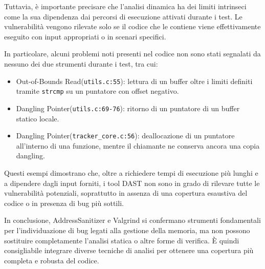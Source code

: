 Tuttavia, è importante precisare che l'analisi dinamica ha dei limiti intrinseci
come la sua dipendenza dai percorsi di esecuzione attivati durante i test. Le vulnerabilità
vengono rilevate solo se il codice che le contiene viene effettivamente eseguito
con input appropriati o in scenari specifici.

In particolare, alcuni problemi noti presenti nel codice non sono stati
segnalati da nessuno dei due strumenti durante i test, tra cui:
\begin{itemize}
  \item Out-of-Bounds Read(\texttt{utils.c:55}): lettura di un buffer oltre i
    limiti definiti tramite \texttt{strcmp} su un puntatore con offset negativo.

  \item Dangling Pointer(\texttt{utils.c:69-76}): ritorno di un puntatore di un
    buffer statico locale.

  \item Dangling Pointer(\texttt{tracker\_core.c:56}): deallocazione di un
    puntatore all'interno di una funzione, mentre il chiamante ne conserva ancora
    una copia dangling.
\end{itemize}

Questi esempi dimostrano che, oltre a richiedere tempi di esecuzione più lunghi
e a dipendere dagli input forniti, i tool DAST non sono in grado di rilevare tutte
le vulnerabilità potenziali, soprattutto in assenza di una copertura esaustiva
del codice o in presenza di bug più sottili.

In conclusione, AddressSanitizer e Valgrind si confermano strumenti fondamentali
per l'individuazione di bug legati alla gestione della memoria, ma non possono
sostituire completamente l'analisi statica o altre forme di verifica. È quindi consigliabile
integrare diverse tecniche di analisi per ottenere una copertura più completa e robusta
del codice.